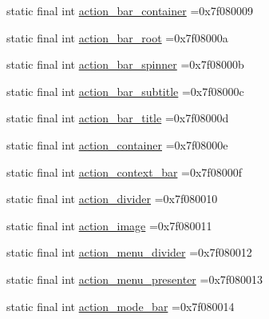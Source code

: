 \begin{DoxyCompactItemize}
\item 
static final int \mbox{\hyperlink{classbr_1_1unb_1_1cic_1_1mp_1_1marketmaster_1_1test_1_1R_1_1id_afedb8392aadc307d121c7e82fcaaefc7}{action\+\_\+bar\+\_\+container}} =0x7f080009
\item 
static final int \mbox{\hyperlink{classbr_1_1unb_1_1cic_1_1mp_1_1marketmaster_1_1test_1_1R_1_1id_a80436ed13f63f687ab9ee8aeaaa4f0bd}{action\+\_\+bar\+\_\+root}} =0x7f08000a
\item 
static final int \mbox{\hyperlink{classbr_1_1unb_1_1cic_1_1mp_1_1marketmaster_1_1test_1_1R_1_1id_a0f0d33867723a38664384c28246941c6}{action\+\_\+bar\+\_\+spinner}} =0x7f08000b
\item 
static final int \mbox{\hyperlink{classbr_1_1unb_1_1cic_1_1mp_1_1marketmaster_1_1test_1_1R_1_1id_a6662f973aec38513cb67b51aed464e66}{action\+\_\+bar\+\_\+subtitle}} =0x7f08000c
\item 
static final int \mbox{\hyperlink{classbr_1_1unb_1_1cic_1_1mp_1_1marketmaster_1_1test_1_1R_1_1id_a2069a1c082e28e182064b6a582a0be25}{action\+\_\+bar\+\_\+title}} =0x7f08000d
\item 
static final int \mbox{\hyperlink{classbr_1_1unb_1_1cic_1_1mp_1_1marketmaster_1_1test_1_1R_1_1id_ac2f0fcba1f2946e9dab6bc615cb02f48}{action\+\_\+container}} =0x7f08000e
\item 
static final int \mbox{\hyperlink{classbr_1_1unb_1_1cic_1_1mp_1_1marketmaster_1_1test_1_1R_1_1id_a8ce4b9953f49352e3c878e08ae8385cc}{action\+\_\+context\+\_\+bar}} =0x7f08000f
\item 
static final int \mbox{\hyperlink{classbr_1_1unb_1_1cic_1_1mp_1_1marketmaster_1_1test_1_1R_1_1id_a3835d5015a7cb868dbd2bad3f6cca42c}{action\+\_\+divider}} =0x7f080010
\item 
static final int \mbox{\hyperlink{classbr_1_1unb_1_1cic_1_1mp_1_1marketmaster_1_1test_1_1R_1_1id_a0821e0fb8113924572c31a43ec9070d2}{action\+\_\+image}} =0x7f080011
\item 
static final int \mbox{\hyperlink{classbr_1_1unb_1_1cic_1_1mp_1_1marketmaster_1_1test_1_1R_1_1id_a9d62adba1907df87aaafc5ee87daa8f6}{action\+\_\+menu\+\_\+divider}} =0x7f080012
\item 
static final int \mbox{\hyperlink{classbr_1_1unb_1_1cic_1_1mp_1_1marketmaster_1_1test_1_1R_1_1id_ae3aadba199781e1d419675e98f5a8557}{action\+\_\+menu\+\_\+presenter}} =0x7f080013
\item 
static final int \mbox{\hyperlink{classbr_1_1unb_1_1cic_1_1mp_1_1marketmaster_1_1test_1_1R_1_1id_aa5fb442adac1d91402e48e6d010f8161}{action\+\_\+mode\+\_\+bar}} =0x7f080014

\end{DoxyCompactItemize}
